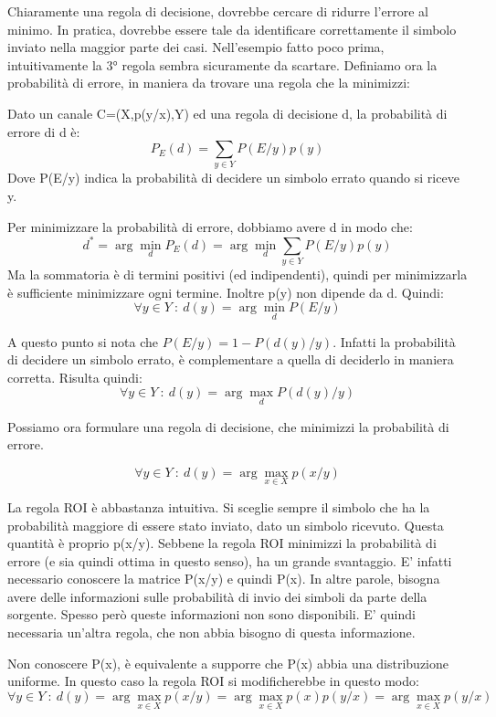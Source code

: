Chiaramente una regola di decisione, dovrebbe cercare di ridurre l'errore al minimo. In pratica, dovrebbe essere tale da identificare 
correttamente il simbolo inviato nella maggior parte dei casi. Nell'esempio fatto poco prima, intuitivamente la 3° regola sembra sicuramente da scartare.
Definiamo ora la probabilità di errore, in maniera da trovare una regola che la minimizzi:
\begin{definizione}
 Dato un canale C=(X,p(y/x),Y) ed una regola di decisione d, la probabilità di errore di d è:
\[
 P_E(d)=\sum_{y \in Y} P(E/y)p(y)
\]
Dove P(E/y) indica la probabilità di decidere un simbolo errato quando si riceve y.
\end{definizione}
\noindent
Per minimizzare la probabilità di errore, dobbiamo avere d in modo che:
\[
 d^*=\arg \min_d P_E(d)=\arg \min_d \sum_{y \in Y} P(E/y)p(y)
\]
Ma la sommatoria è di termini positivi (ed indipendenti), quindi per minimizzarla è sufficiente minimizzare ogni termine.
Inoltre p(y) non dipende da d. Quindi:
\[
 \forall y \in Y \ : \ d(y)=\arg \min_d P(E/y)
\]

\noindent
A questo punto si nota che $P(E/y)=1-P(d(y)/y)$. Infatti la probabilità di decidere un simbolo errato, è complementare a quella di deciderlo in maniera corretta.
Risulta quindi:
\[
 \forall y \in Y \ : \ d(y)=\arg \max_d P(d(y)/y)
\]

\noindent
Possiamo ora formulare una regola di decisione, che minimizzi la probabilità di errore.

\begin{definizione}
\[
 \forall y \in Y \ : \ d(y)=\arg \max_{x \in X} p(x/y)
\]
\end{definizione}

La regola ROI è abbastanza intuitiva. Si sceglie sempre il simbolo che ha la probabilità maggiore di essere stato inviato, 
dato un simbolo ricevuto. Questa quantità è proprio p(x/y).
Sebbene la regola ROI minimizzi la probabilità di errore (e sia quindi ottima in questo senso), ha un grande svantaggio.
E' infatti necessario conoscere la matrice P(x/y) e quindi P(x). In altre parole, bisogna avere delle informazioni sulle 
probabilità di invio dei simboli da parte della sorgente. Spesso però queste informazioni non sono disponibili. E' quindi necessaria 
un'altra regola, che non abbia bisogno di questa informazione.

Non conoscere P(x), è equivalente a supporre che P(x) abbia una distribuzione uniforme. In questo caso la regola ROI si modificherebbe 
in questo modo:
\[
 \forall y \in Y \ : \ d(y)=\arg \max_{x \in X} p(x/y)=\arg \max_{x \in X} p(x)p(y/x)=\arg \max_{x \in X} p(y/x)
\]

